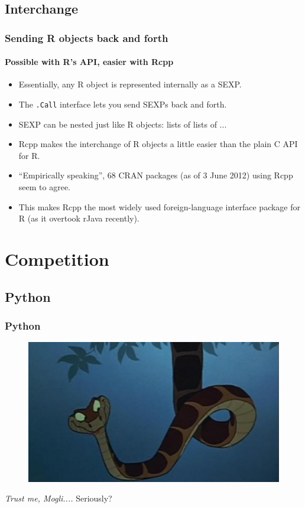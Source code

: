 \documentclass[dvipsnames,compress,pdflatex,beamer]{beamer}
\begin{document}
\subsection{Interchange}
\begin{frame}
  \frametitle{Sending R objects back and forth}
  \framesubtitle{Possible with R's API, easier with Rcpp}
  \begin{itemize}[<+->]
  \item Essentially, any R object is represented internally as a SEXP.
  \item The \texttt{.Call} interface lets you send SEXPs back and forth.
  \item SEXP can be nested just like R objects: lists of lists of ...
  \item Rcpp makes the interchange of R objects a little easier than the
    plain C API for R. 
  \item ``Empirically speaking'', 68 CRAN packages (as
    of 3 June 2012) using Rcpp seem to agree.
  \item This makes Rcpp the most widely used foreign-language interface
    package for R (as it overtook rJava recently). 
  \end{itemize}
\end{frame}

\section{Competition}

\subsection{Python}
\begin{frame}
  \frametitle{Python}
  \pause

  \begin{figure}
    \includegraphics[scale=0.6]{images/jungle-book-kaa.jpg}
  \end{figure}

  \smallskip
  
  \pause
  \emph{Trust me, Mogli....}   Seriously?
\end{frame}
\end{document}
